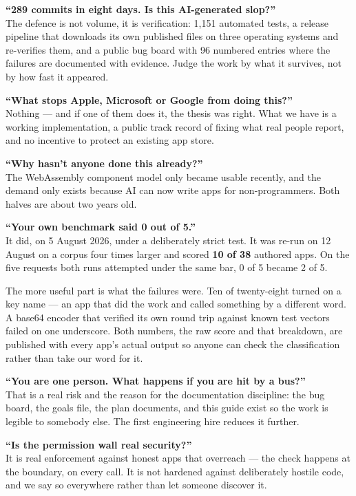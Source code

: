 \documentclass[11pt,a4paper]{report}
\begin{document}
\textbf{``289 commits in eight days. Is this AI-generated slop?''}\\
The defence is not volume, it is verification: 1{,}151 automated tests, a
release pipeline that downloads its own published files on three operating
systems and re-verifies them, and a public bug board with 96 numbered
entries where the failures are documented with evidence. Judge the work by
what it survives, not by how fast it appeared.

\textbf{``What stops Apple, Microsoft or Google from doing this?''}\\
Nothing --- and if one of them does it, the thesis was right. What we have
is a working implementation, a public track record of fixing what real
people report, and no incentive to protect an existing app store.

\textbf{``Why hasn't anyone done this already?''}\\
The WebAssembly component model only became usable recently, and the
demand only exists because AI can now write apps for non-programmers. Both
halves are about two years old.

\textbf{``Your own benchmark said 0 out of 5.''}\\
It did, on 5 August 2026, under a deliberately strict test. It was re-run
on 12 August on a corpus four times larger and scored \textbf{10 of 38}
authored apps. On the five requests both runs attempted under the same
bar, 0 of 5 became 2 of 5.

The more useful part is what the failures were. Ten of twenty-eight
turned on a key name --- an app that did the work and called something by
a different word. A base64 encoder that verified its own round trip
against known test vectors failed on one underscore. Both numbers, the
raw score and that breakdown, are published with every app's actual
output so anyone can check the classification rather than take our word
for it.

\textbf{``You are one person. What happens if you are hit by a bus?''}\\
That is a real risk and the reason for the documentation discipline: the
bug board, the goals file, the plan documents, and this guide exist so the
work is legible to somebody else. The first engineering hire reduces it
further.

\textbf{``Is the permission wall real security?''}\\
It is real enforcement against honest apps that overreach --- the check
happens at the boundary, on every call. It is not hardened against
deliberately hostile code, and we say so everywhere rather than let
someone discover it.
\end{document}
